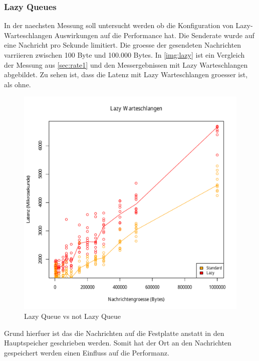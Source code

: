 \subsubsection{Lazy Queues}
\label{sec:rmqLazy}
In der naechsten Messung soll untersucht werden ob die Konfiguration von Lazy-Warteschlangen Auswirkungen auf die Performance hat. Die Senderate wurde auf eine Nachricht pro Sekunde limitiert. Die groesse der gesendeten Nachrichten varriieren zwischen 100 Byte und 100.000 Bytes.
In \autoref{img:lazy} ist ein Vergleich der Messung aus \autoref{sec:rate1} und den Messergebnissen mit Lazy Warteschlangen abgebildet. Zu sehen ist, dass die Latenz mit Lazy Warteschlangen groesser ist, als ohne.
\begin{figure}
\center
  \includegraphics[width=1\textwidth]{images/measurement/lazy-queues.pdf}
  \caption{Lazy Queue vs not Lazy Queue}
  \label{img:lazy}
\end{figure}
Grund hierfuer ist das die Nachrichten auf die Festplatte anstatt in den Hauptspeicher geschrieben werden. Somit hat der Ort an den Nachrichten gespeichert werden einen Einfluss auf die Performanz.



